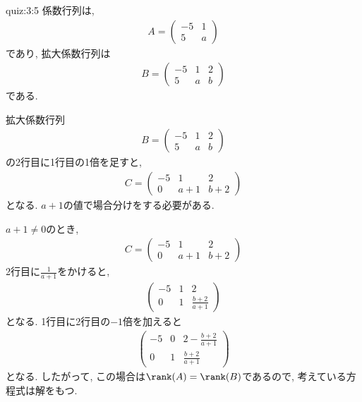 \begin{answerof}{quiz:3:5}
  係数行列は,
  \begin{align*}
    A=\begin{pmatrix}-5&1\\5&a\end{pmatrix}
  \end{align*}
  であり,
  拡大係数行列は
  \begin{align*}
    B=\begin{pmatrix}-5&1&2\\5&a&b\end{pmatrix}
  \end{align*}
  である.

  拡大係数行列
  \begin{align*}
    B=\begin{pmatrix}-5&1&2\\5&a&b\end{pmatrix}
  \end{align*}
  の2行目に1行目の1倍を足すと,
  \begin{align*}
    C=\begin{pmatrix}-5&1&2\\0&a+1&b+2\end{pmatrix}
  \end{align*}
  となる.
  $a+1$の値で場合分けをする必要がある.

  $a+1\neq 0$のとき,
  \begin{align*}
    C=\begin{pmatrix}-5&1&2\\0&a+1&b+2\end{pmatrix}
  \end{align*}
  2行目に$\frac{1}{a+1}$をかけると,
  \begin{align*}
    \begin{pmatrix}-5&1&2\\0&1&\frac{b+2}{a+1}\end{pmatrix}
  \end{align*}
  となる.
  1行目に2行目の$-1$倍を加えると
  \begin{align*}
    \begin{pmatrix}-5&0&2-\frac{b+2}{a+1}\\0&1&\frac{b+2}{a+1}\end{pmatrix}
  \end{align*}
  となる.
  したがって, この場合は$\rank(A)=\rank(B)$であるので,
  考えている方程式は解をもつ.



\end{answerof}
